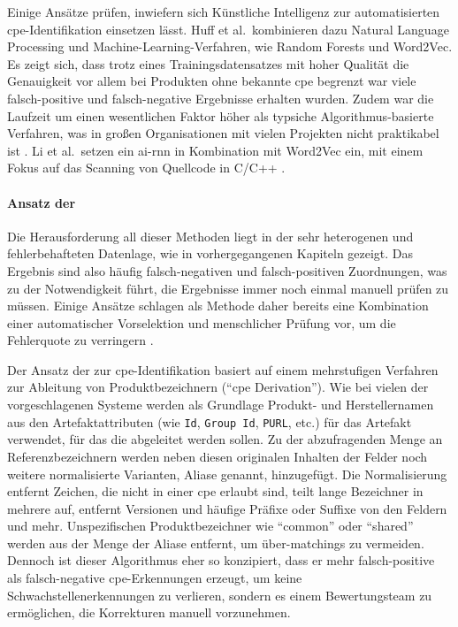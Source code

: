 Einige Ansätze prüfen, inwiefern sich Künstliche Intelligenz zur automatisierten \acrshort{cpe}-Identifikation einsetzen lässt.
Huff et al.\ kombinieren dazu Natural Language Processing und Machine-Learning-Verfahren, wie Random Forests und Word2Vec.
Es zeigt sich, dass trotz eines Trainingsdatensatzes mit hoher Qualität die Genauigkeit vor allem bei Produkten ohne bekannte \acrshort{cpe} begrenzt war viele falsch-positive und falsch-negative Ergebnisse erhalten wurden.
Zudem war die Laufzeit um einen wesentlichen Faktor höher als typsiche Algorithmus-basierte Verfahren, was in großen Organisationen mit vielen Projekten nicht praktikabel ist \autocite{Huff2021Recommender}.
Li et al.\ setzen ein \acrfull{ai-rnn} in Kombination mit Word2Vec ein, mit einem Fokus auf das Scanning von Quellcode in C/C++ \autocite{8846081}.

\paragraph{Ansatz der \metaeffekt}

Die Herausforderung all dieser Methoden liegt in der sehr heterogenen und fehlerbehafteten Datenlage, wie in vorhergegangenen Kapiteln gezeigt.
Das Ergebnis sind also häufig falsch-negativen und falsch-positiven Zuordnungen, was zu der Notwendigkeit führt, die Ergebnisse immer noch einmal manuell prüfen zu müssen.
Einige Ansätze schlagen als Methode daher bereits eine Kombination einer automatischer Vorselektion und menschlicher Prüfung vor, um die Fehlerquote zu verringern \autocite{Takahashi_Miyamoto_Nakao_2016, Sanguino_Uetz_2017}.

Der Ansatz der \metaeffekt zur \acrshort{cpe}-Identifikation basiert auf einem mehrstufigen Verfahren zur Ableitung von Produktbezeichnern (\enquote{\acrshort{cpe} Derivation}).
Wie bei vielen der vorgeschlagenen Systeme werden als Grundlage Produkt- und Herstellernamen aus den Artefaktattributen (wie \texttt{Id}, \texttt{Group Id}, \texttt{PURL}, etc.) für das Artefakt verwendet, für das die  abgeleitet werden sollen.
Zu der abzufragenden Menge an Referenzbezeichnern werden neben diesen originalen Inhalten der Felder noch weitere normalisierte Varianten, Aliase genannt, hinzugefügt.
Die Normalisierung entfernt Zeichen, die nicht in einer \acrshort{cpe} erlaubt sind, teilt lange Bezeichner in mehrere auf, entfernt Versionen und häufige Präfixe oder Suffixe von den Feldern und mehr.
Unspezifischen Produktbezeichner wie \enquote{common} oder \enquote{shared} werden aus der Menge der Aliase entfernt, um über-matchings zu vermeiden.
Dennoch ist dieser Algorithmus eher so konzipiert, dass er mehr falsch-positive als falsch-negative \acrshort{cpe}-Erkennungen erzeugt, um keine Schwachstellenerkennungen zu verlieren, sondern es einem Bewertungsteam zu ermöglichen, die Korrekturen manuell vorzunehmen.

